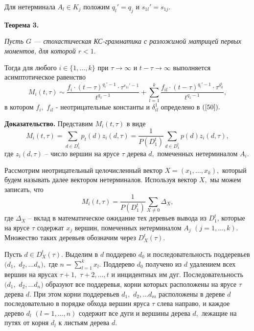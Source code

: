 \documentclass[%
11pt,a4paper]{article}
\begin{document}
{{{Для нетерминала $A_l \in K_j$ положим $q_l'=q_j$ и $s_{1l}'=s_{1j}.$

\medskip

\textbf {Теорема 3.}
{\em Пусть $G$ --- стохастическая КС-грамматика с разложимой
матрицей первых моментов, для которой $r<1.$ 

Тогда для любого $i \in \{1, \ldots, k\}$ при $\tau \rightarrow \infty $
и $t-\tau \rightarrow \infty $
выполняется асимптотическое равенство
$$
M_i(t,\tau)\sim \frac {f_i \cdot(t-\tau)^{q_i'-1} \cdot \tau^{s_{1i}'-1} }{t^{q_1-1}}+
\sum_{l =1}^k \frac{f_{il} \cdot (t-\tau)^{q_l'-1}\cdot \tau^{\delta_{il}^1}}{t^{q_1-1}},
$$
в котором $f_{i},$ $f_{il}$ - неотрицательные константы и $\delta_{il}^1$ определено в $(\ref{50}).$


}

\medskip

\textbf {Доказательство.}
Представим $M_i(t,\tau)$ в виде
$$
M_i(t,\tau)=\sum_{d \in D^t_1} p_t(d) z_{i}(d,\tau)=\frac{1}{P(D_1^t)}\sum_{d \in D^t_1} p(d) z_{i}(d,\tau),
$$
где $z_i (d,\tau)$ --  число вершин на ярусе $\tau$ дерева $d,$
помеченных нетерминалом $A_i.$

Рассмотрим неотрицательный целочисленный вектор $X=(x_1,\ldots,x_k),$
который будем называть далее вектором нетерминалов.
Используя вектор $X,$ мы можем записать, что
$$
M_i(t,\tau)= \frac{1}{P(D_1^t)}\sum_{X \ne 0} \Delta_X,
$$
где $\Delta_X$ -- вклад в математическое ожидание тех деревьев вывода
из $D^t_1$, которые на ярусе $\tau$ содержат $x_j$ вершин, помеченных
нетерминалом $A_j$ $(j=1,\ldots, k).$ Множество таких деревьев обозначим
через $D_X^t(\tau).$

Пусть $d \in D_X^t(\tau).$ Выделим в $d$ поддерево $d_0$ и последовательность
поддеревьев $(d_1,$ $d_2, \ldots d_n),$ где $n=\sum_{l=1}^k x_l.$
Поддерево $d_0$ получено из $d$ удалением всех вершин на ярусах
$\tau+1,$ $\tau+2, \ldots, t$ и инцидентных им дуг. Последовательность
$(d_1,$ $d_2, \ldots d_n)$ образуют все поддеревья, корни которых расположены
на ярусе $\tau$ дерева $d.$
При этом корни поддеревьев $d_1,$ $d_2, \ldots d_m$ расположены в дереве $d$
последовательно в порядке обхода вершин яруса $\tau$ слева направо, и каждое
дерево $d_l$ $(l=1,\ldots,n)$ содержит все дуги и вершины дерева $d,$
лежащие на путях от корня $d_l$ к листьям дерева $d.$

}}}
\end{document}
